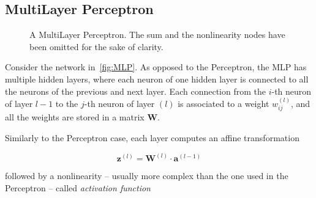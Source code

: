 \subsection{MultiLayer Perceptron}\label{sec:MLP}
\begin{figure}[h]
    \centering
    \begin{neuralnetwork} [nodespacing=7.5mm, layerspacing=23mm,
            maintitleheight=2.5em, layertitleheight=5em,
            height=3, toprow=true, nodesize=17pt,
            style={}, title={}, titlestyle={}]
        \hiddenlayer[count=3, bias=true, title=Layer 1, text=\nodetexthi]
        {\setdefaultlinklabel{\wijllink}\linklayers}
        \hiddenlayer[count=5, bias=true, title=Layer 2, text=\nodetexthi]
        {\setdefaultlinklabel{\wijllink}\linklayers}
        \hiddenlayer[count=4, bias=true, title=Layer 3, text=\nodetexthi]
        {\setdefaultlinklabel{\wijllink}\linklayers}
        \outputlayer[count=1, text=\nodetexty]
        {\setdefaultlinklabel{\wijllink}\linklayers}
    \end{neuralnetwork}
    \centering
    \caption{\label{fig:MLP}A MultiLayer Perceptron. The sum and the
        nonlinearity nodes have been omitted for the sake of clarity.
    }
\end{figure}

\noindent Consider the network in~\autoref{fig:MLP}. As opposed to the
Perceptron, the MLP has multiple hidden layers, where each neuron of one hidden
layer is connected to all the neurons of the previous and next layer. Each
connection from the $i$-th neuron of layer $l-1$ to the $j$-th neuron of layer
$(l)$ is associated to a weight $w_{ij}^{(l)}$, and all the weights are stored
in a matrix $\mathbf{W}$.

Similarly to the Perceptron case, each layer computes an affine transformation

\begin{equation}\label{eq:MLP_affine}
    \mathbf{z}^{(l)} = \mathbf{W}^{(l)} \cdot \mathbf{a}^{(l-1)}
\end{equation}

\noindent followed by a nonlinearity -- usually more complex than the one
used in the Perceptron -- called \emph{activation function}

